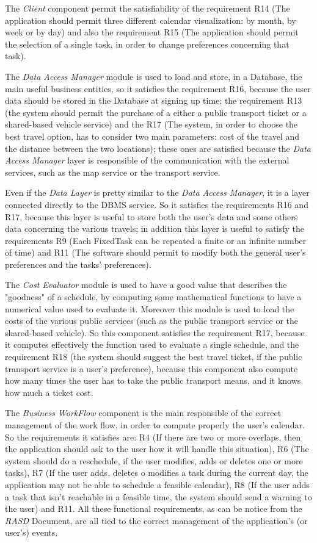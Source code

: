 The \emph{Client} component permit the satisfiability of the requirement R14 (The application should permit three different calendar visualization: by month, by week or by day) and also the requirement R15 (The application should permit the selection of a single task, in order to change preferences concerning that task).

The \emph{Data Access Manager} module is used to load and store, in a Database, the main useful business entities, so it satisfies the requirement R16, because the user data should be stored in the Database at signing up time; the requirement R13 (the system should permit the purchase of a either a public transport ticket or a shared-based vehicle service) and the R17 (The system, in order to choose the best travel option, has to consider two main parameters: cost of the travel and the distance between the two locations); these ones are satisfied because the \emph{Data Access Manager} layer is responsible of the communication with the external services, such as the map service or the transport service.

Even if the \emph{Data Layer} is pretty similar to the \emph{Data Access Manager}, it is a layer connected directly to the DBMS service. So it satisfies the requirements R16 and R17, because this layer is useful to store both the user's data and some others data concerning the various travels; in addition this layer is useful to satisfy the requirements R9 (Each FixedTask can be repeated a finite or an infinite number of time) and R11 (The software should permit to modify both the general user's preferences and the tasks' preferences).

The \emph{Cost Evaluator} module is used to have a good value that describes the "goodness" of a schedule, by computing some mathematical functions to have a numerical value used to evaluate it. Moreover this module is used to load the costs of the various public services (such as the public transport service or the shared-based vehicle). So this component satisfies the requirement R17, because it computes effectively the function used to evaluate a single schedule, and the requirement R18 (the system should suggest the best travel ticket, if the public transport service is a user's preference), because this component also compute how many times the user has to take the public transport means, and it knows how much a ticket cost.

The \emph{Business WorkFlow} component is the main responsible of the correct management of the work flow, in order to compute properly the user's calendar. So the requirements it satisfies are: R4 (If there are two or more overlaps, then the application should ask to the user how it will handle this situation), R6 (The system should do a reschedule, if the user modifies, adds or deletes one or more tasks), R7 (If the user adds, deletes o modifies a task during the current day, the application may not be able to schedule a feasible calendar), R8 (If the user adds a task that isn't reachable in a feasible time, the system should send a warning to the user) and R11. All these functional requirements, as can be notice from the \emph{RASD} Document, are all tied to the correct management of the application's (or user's) events.

